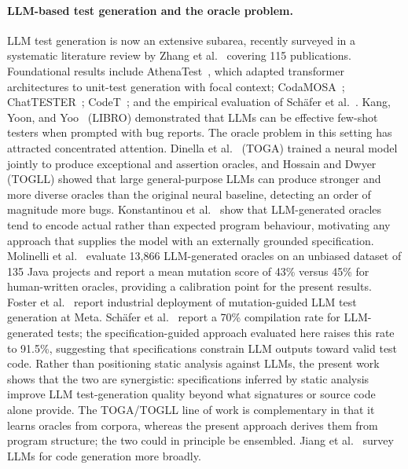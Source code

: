 \documentclass[11pt]{article}
\begin{document}
\paragraph{LLM-based test generation and the oracle problem.}
LLM test generation is now an extensive subarea, recently surveyed in a systematic literature review by Zhang et al.~\cite{zhang2025llmunitsurvey} covering 115 publications. Foundational results include AthenaTest~\cite{tufano2020athenatest}, which adapted transformer architectures to unit-test generation with focal context; CodaMOSA~\cite{lemieux2023codamosa}; ChatTESTER~\cite{yuan2024chattester}; CodeT~\cite{chen2022codet}; and the empirical evaluation of Sch\"{a}fer et al.~\cite{schafer2023adaptive}. Kang, Yoon, and Yoo~\cite{kang2023libro} (LIBRO) demonstrated that LLMs can be effective few-shot testers when prompted with bug reports. The oracle problem in this setting has attracted concentrated attention. Dinella et al.~\cite{dinella2022toga} (TOGA) trained a neural model jointly to produce exceptional and assertion oracles, and Hossain and Dwyer~\cite{hossain2024togll} (TOGLL) showed that large general-purpose LLMs can produce stronger and more diverse oracles than the original neural baseline, detecting an order of magnitude more bugs. Konstantinou et al.~\cite{konstantinou2024oracles} show that LLM-generated oracles tend to encode actual rather than expected program behaviour, motivating any approach that supplies the model with an externally grounded specification. Molinelli et al.~\cite{molinelli2025oracles} evaluate 13{,}866 LLM-generated oracles on an unbiased dataset of 135 Java projects and report a mean mutation score of 43\% versus 45\% for human-written oracles, providing a calibration point for the present results. Foster et al.~\cite{foster2025meta} report industrial deployment of mutation-guided LLM test generation at Meta. Sch\"{a}fer et al.~\cite{schafer2023adaptive} report a 70\% compilation rate for LLM-generated tests; the specification-guided approach evaluated here raises this rate to 91.5\%, suggesting that specifications constrain LLM outputs toward valid test code. Rather than positioning static analysis against LLMs, the present work shows that the two are synergistic: specifications inferred by static analysis improve LLM test-generation quality beyond what signatures or source code alone provide. The TOGA/TOGLL line of work is complementary in that it learns oracles from corpora, whereas the present approach derives them from program structure; the two could in principle be ensembled. Jiang et al.~\cite{jiang2024survey} survey LLMs for code generation more broadly.
\end{document}
